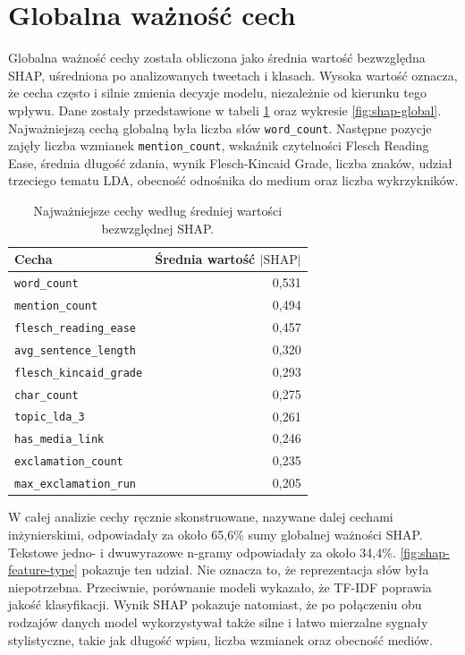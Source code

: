 \documentclass[12pt, a4paper, oneside]{scrreprt}
\begin{document}
\section{Globalna ważność cech}

Globalna ważność cechy została obliczona jako średnia wartość bezwzględna SHAP,
uśredniona po analizowanych tweetach i klasach. Wysoka wartość oznacza,
że cecha często i silnie zmienia decyzje modelu, niezależnie od kierunku
tego wpływu. Dane zostały przedstawione w tabeli \ref{tab:shap-global} oraz wykresie \ref{fig:shap-global}.
Najważniejszą cechą globalną była liczba słów \texttt{word\_count}.
Następne pozycje zajęły liczba wzmianek \texttt{mention\_count},
wskaźnik czytelności Flesch Reading Ease, średnia długość zdania,
wynik Flesch-Kincaid Grade, liczba znaków, udział trzeciego tematu LDA,
obecność odnośnika do medium oraz liczba wykrzykników.

\begin{table}[H]
\centering
\caption{Najważniejsze cechy według średniej wartości bezwzględnej SHAP.}
\label{tab:shap-global}
\begin{tabular}{lr}
\toprule
Cecha & Średnia wartość $|\mathrm{SHAP}|$ \\
\midrule
\texttt{word\_count} & 0,531 \\
\texttt{mention\_count} & 0,494 \\
\texttt{flesch\_reading\_ease} & 0,457 \\
\texttt{avg\_sentence\_length} & 0,320 \\
\texttt{flesch\_kincaid\_grade} & 0,293 \\
\texttt{char\_count} & 0,275 \\
\texttt{topic\_lda\_3} & 0,261 \\
\texttt{has\_media\_link} & 0,246 \\
\texttt{exclamation\_count} & 0,235 \\
\texttt{max\_exclamation\_run} & 0,205 \\
\bottomrule
\end{tabular}
\end{table}

W całej analizie cechy ręcznie skonstruowane, nazywane dalej cechami inżynierskimi,
odpowiadały za około 65,6\% sumy globalnej ważności SHAP.
Tekstowe jedno- i dwuwyrazowe n-gramy odpowiadały za około 34,4\%.
\ref{fig:shap-feature-type} pokazuje ten udział.
Nie oznacza to, że reprezentacja słów była niepotrzebna. Przeciwnie,
porównanie modeli wykazało, że TF-IDF poprawia jakość klasyfikacji.
Wynik SHAP pokazuje natomiast, że po połączeniu obu rodzajów danych
model wykorzystywał także silne i łatwo mierzalne sygnały stylistyczne,
takie jak długość wpisu, liczba wzmianek oraz obecność mediów.
\end{document}
